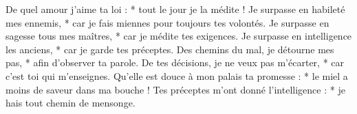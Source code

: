 De quel amour j’aime ta loi : *
tout le jour je la médite !
\versseparator
Je surpasse en habileté mes ennemis, *
car je fais miennes pour toujours tes volontés.
\versseparator
Je surpasse en sagesse tous mes maîtres, *
car je médite tes exigences.
\versseparator
Je surpasse en intelligence les anciens, *
car je garde tes préceptes.
\versseparator
Des chemins du mal, je détourne mes pas, *
afin d’observer ta parole.
\versseparator
De tes décisions, je ne veux pas m’écarter, *
car c’est toi qui m’enseignes.
\versseparator
Qu’elle est douce à mon palais ta promesse : *
le miel a moins de saveur dans ma bouche !
\versseparator
Tes préceptes m’ont donné l’intelligence : *
je hais tout chemin de mensonge.
